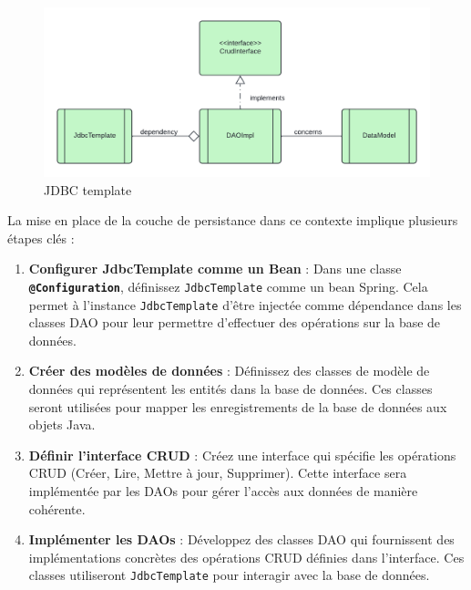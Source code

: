 \documentclass{article}
\begin{document}
\begin{figure}[H]
    \centering
    \begin{framed}
        \includegraphics[width=0.8\linewidth]{images/jdbc_tem_businesslog.png}
    \end{framed}
    \caption{JDBC template}
    \label{fig:spring-logo}
\end{figure}

La mise en place de la couche de persistance dans ce contexte implique plusieurs étapes clés :

\begin{enumerate}
    \item \textbf{Configurer JdbcTemplate comme un Bean} : Dans une classe \textbf{\texttt{@Configuration}}, définissez \texttt{JdbcTemplate} comme un bean Spring. Cela permet à l'instance \texttt{JdbcTemplate} d'être injectée comme dépendance dans les classes DAO pour leur permettre d'effectuer des opérations sur la base de données.

    \item \textbf{Créer des modèles de données} : Définissez des classes de modèle de données qui représentent les entités dans la base de données. Ces classes seront utilisées pour mapper les enregistrements de la base de données aux objets Java.

    \item \textbf{Définir l'interface CRUD} : Créez une interface qui spécifie les opérations CRUD (Créer, Lire, Mettre à jour, Supprimer). Cette interface sera implémentée par les DAOs pour gérer l'accès aux données de manière cohérente.

    \item \textbf{Implémenter les DAOs} : Développez des classes DAO qui fournissent des implémentations concrètes des opérations CRUD définies dans l'interface. Ces classes utiliseront \texttt{JdbcTemplate} pour interagir avec la base de données.
\end{enumerate}
\end{document}
